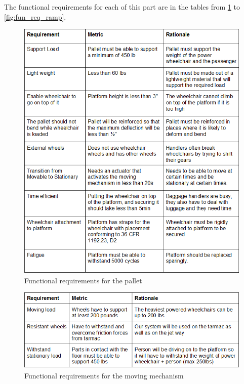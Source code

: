 The functional requirements for each of this part are in the tables from \ref{fig:fun_req_pallet} to \ref{fig:fun_req_ramp}.

\newpage

\begin{figure}[h!]
  \centering
     \includegraphics[scale=1]{images/functional_requirements_pallet.png}
   \caption{Functional requirements for the pallet}
  \label{fig:fun_req_pallet}
\end{figure}

\newpage

\begin{figure}[h!]
  \centering
     \includegraphics[scale=1]{images/functional_requirements_moving_mechanism.png}
   \caption{Functional requirements for the moving mechanism}
  \label{fig:fun_req_moving_mechanism}
\end{figure}

